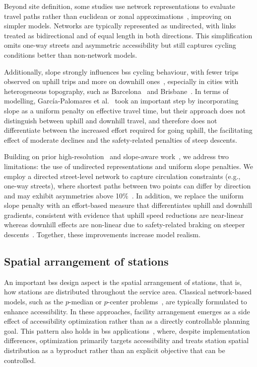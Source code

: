 Beyond site definition, some studies use network representations to evaluate travel paths rather than euclidean or zonal approximations~\cite{GarciaPalomares2012, Cintrano2018, Xin2013}, improving on simpler models. Networks are typically represented as undirected, with links treated as bidirectional and of equal length in both directions. This simplification omits one-way streets and asymmetric accessibility but still captures cycling conditions better than non-network models.

Additionally, slope strongly influences \ac{bss} cycling behaviour, with fewer trips observed on uphill trips and more on downhill ones~\cite{Morency2015, MateoBabiano2016}, especially in cities with heterogeneous topography, such as Barcelona~\cite{Grau-Escolano2024} and Brisbane~\cite{MateoBabiano2016}. In terms of modelling, García-Palomares et al.~\cite{GarciaPalomares2012} took an important step by incorporating slope as a uniform penalty on effective travel time, but their approach does not distinguish between uphill and downhill travel, and therefore does not differentiate between the increased effort required for going uphill, the facilitating effect of moderate declines and the safety-related penalties of steep descents.

Building on prior high-resolution~\cite{Cintrano2018, Xin2013} and slope-aware work~\cite{GarciaPalomares2012}, we address two limitations: the use of undirected representations and uniform slope penalties. We employ a directed street-level network to capture circulation constraints (e.g., one-way streets), where shortest paths between two points can differ by direction and may exhibit asymmetries above 10\%~\cite{Melo2022}. In addition, we replace the uniform slope penalty with an effort-based measure that differentiates uphill and downhill gradients, consistent with evidence that uphill speed reductions are near-linear whereas downhill effects are non-linear due to safety-related braking on steeper descents~\cite{Ryeng2016, Flugel2019}. Together, these improvements increase model realism.


\subsection{Spatial arrangement of stations}

An important \ac{bss} design aspect is the spatial arrangement of stations, that is, how stations are distributed throughout the service area. Classical network-based models, such as the $p$-median or $p$-center problems~\cite{Hakimi1964, Hakimi1965}, are typically formulated to enhance accessibility. In these approaches, facility arrangement emerges as a side effect of accessibility optimization rather than as a directly controllable planning goal. This pattern also holds in \ac{bss} applications~\cite{Frade2015, Cintrano2018, Lin2011, Mete2018}, where, despite implementation differences, optimization primarily targets accessibility and treats station spatial distribution as a byproduct rather than an explicit objective that can be controlled.

